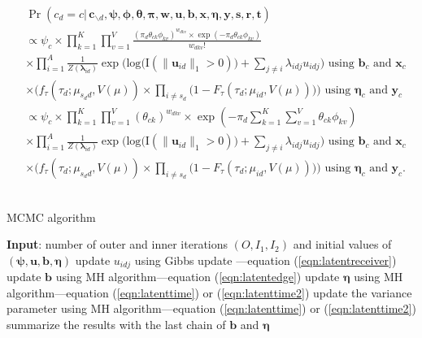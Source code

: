 \documentclass[ba]{imsart}
\def\spacingset#1{\renewcommand{\baselinestretch}%
	{#1}\small\normalsize} \spacingset{1}
\numberwithin{equation}{section}
\theoremstyle{plain}
\begin{document}
				\begin{equation}
				\begin{aligned}
				&	\Pr(c_d=c|\,\boldsymbol{c}_{\backslash d},\boldsymbol{\psi},\boldsymbol{\phi},\boldsymbol{\theta},\boldsymbol{\pi},\boldsymbol{w},\boldsymbol{u},\boldsymbol{b},\boldsymbol{x},\boldsymbol{\eta},\boldsymbol{y},\boldsymbol{s}, \boldsymbol{r},\boldsymbol{t}) \\& \propto \psi_c \times 	\prod_{k=1}^K\prod_{v=1}^V \frac{(\pi_{d} \theta_{ck}\phi_{kv})^{w_{dkv}}\times \exp(-\pi_{d} \theta_{ck}\phi_{kv})}{w_{dkv}!}\\& \times \prod_{i=1}^A \frac{1}{Z(\boldsymbol{\lambda}_{id})}\exp\Big(\mbox{log}\big(\text{I}( \lVert \boldsymbol{u}_{id}\rVert_1 > 0 )\big) + \sum_{j\neq i} \lambda_{idj}u_{idj}\Big) \mbox{ using } \boldsymbol{b}_c \mbox{ and }\boldsymbol{x}_c  \\&\times \Big(f_{\tau}(\tau_{d}; \mu_{s_d d}, V(\mu))\times \prod_{i\neq s_d}\big(1-F_{\tau}(\tau_{d}; \mu_{id}, V(\mu)) \big)\Big)\mbox{ using } \boldsymbol{\eta}_c \mbox{ and }\boldsymbol{y}_c \\&\propto
				 \psi_c \times 	\prod_{k=1}^K\prod_{v=1}^V {( \theta_{ck})^{w_{dkv}}\times \exp(-\pi_{d} \sum_{k=1}^K\sum_{v=1}^V \theta_{ck}\phi_{kv})}\\& \times \prod_{i=1}^A \frac{1}{Z(\boldsymbol{\lambda}_{id})}\exp\Big(\mbox{log}\big(\text{I}( \lVert \boldsymbol{u}_{id}\rVert_1 > 0 )\big) + \sum_{j\neq i} \lambda_{idj}u_{idj}\Big) \mbox{ using } \boldsymbol{b}_c \mbox{ and }\boldsymbol{x}_c  \\&\times \Big(f_{\tau}(\tau_{d}; \mu_{s_d d}, V(\mu))\times \prod_{i\neq s_d}\big(1-F_{\tau}(\tau_{d}; \mu_{id}, V(\mu)) \big)\Big)\mbox{ using } \boldsymbol{\eta}_c \mbox{ and }\boldsymbol{y}_c.
				\end{aligned}	
				\end{equation}
	~				
		\begin{algorithm}[!t]
			\spacingset{1}
			\SetAlgoLined
			\caption{MCMC algorithm}
			\begin{algorithmic}
				\STATE \textbf{Input}: number of outer and inner iterations $(O, I_1, I_2)$ and initial values of $(\boldsymbol{\psi}, \boldsymbol{u}, \boldsymbol{b}, \boldsymbol{\eta})$
				\vskip 0.1in
				\STATE update $u_{idj}$ using Gibbs update ---equation (\ref{eqn:latentreceiver})
				\ENDFOR
				\ENDFOR
				\ENDFOR
				\STATE update $\boldsymbol{b}$ using MH algorithm---equation (\ref{eqn:latentedge})
				\ENDFOR
				\STATE update $\boldsymbol{\eta}$ using MH algorithm---equation (\ref{eqn:latenttime}) or (\ref{eqn:latenttime2}) 
				\ENDFOR
				\STATE update the variance parameter using MH algorithm---equation (\ref{eqn:latenttime}) or (\ref{eqn:latenttime2}) 
				\ENDIF
				\ENDFOR
				\STATE	summarize the results with the last chain of $\boldsymbol{b}$ and $\boldsymbol{\eta}$
			\end{algorithmic}
			\label{alg:MCMC}
		\end{algorithm}
		
\end{document}
